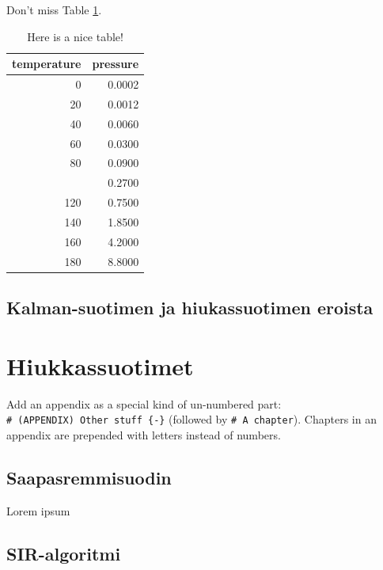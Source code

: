\documentclass[
  12pt,
  a4paper, twoside]{book}
\theoremstyle{definition}
\theoremstyle{definition}
\theoremstyle{definition}
\theoremstyle{definition}
\theoremstyle{remark}
\begin{document}
Don't miss Table \ref{tab:nice-tab}.

\begin{table}

\caption{\label{tab:nice-tab}Here is a nice table!}
\centering
\begin{tabular}[t]{rr}
\toprule
temperature & pressure\\
\midrule
0 & 0.0002\\
20 & 0.0012\\
40 & 0.0060\\
60 & 0.0300\\
80 & 0.0900\\
\addlinespace
100 & 0.2700\\
120 & 0.7500\\
140 & 1.8500\\
160 & 4.2000\\
180 & 8.8000\\
\bottomrule
\end{tabular}
\end{table}

\hypertarget{kalman-suotimen-ja-hiukassuotimen-eroista}{%
\section{Kalman-suotimen ja hiukassuotimen eroista}\label{kalman-suotimen-ja-hiukassuotimen-eroista}}

\hypertarget{hiukkassuotimet}{%
\chapter{Hiukkassuotimet}\label{hiukkassuotimet}}

Add an appendix as a special kind of un-numbered part: \texttt{\#\ (APPENDIX)\ Other\ stuff\ \{-\}} (followed by \texttt{\#\ A\ chapter}). Chapters in an appendix are prepended with letters instead of numbers.

\hypertarget{saapasremmisuodin}{%
\section{Saapasremmisuodin}\label{saapasremmisuodin}}

Lorem ipsum

\hypertarget{sir-algoritmi}{%
\section{SIR-algoritmi}\label{sir-algoritmi}}
\end{document}
